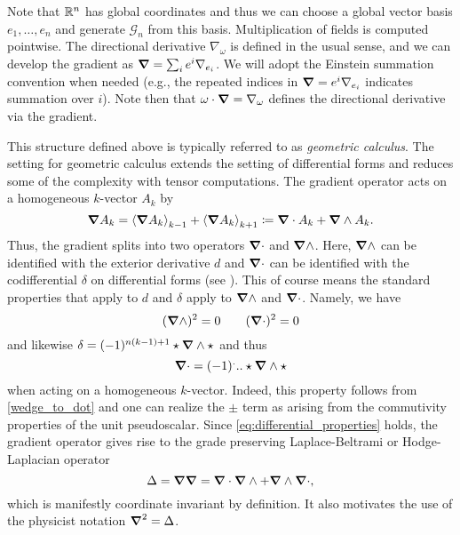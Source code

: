 \documentclass[12pt]{article}
\begin{document}
Note that $\R^n$ has global coordinates and thus we can choose a global vector basis $e_1,\dots,e_n$ and generate $\mathcal{G}_n$ from this basis.  Multiplication of fields is computed pointwise. The directional derivative $\nabla_\omega$ is defined in the usual sense, and we can develop the gradient as $\grad = \sum_{i} e^i \nabla_{e_i}$.  We will adopt the Einstein summation convention when needed (e.g., the repeated indices in $\grad = e^i \nabla_{e_i}$ indicates summation over $i$). Note then that $\omega \cdot \grad = \nabla_\omega$ defines the directional derivative via the gradient.  

This structure defined above is typically referred to as \emph{geometric calculus}.  The setting for geometric calculus extends the setting of differential forms and reduces some of the complexity with tensor computations.  The gradient operator acts on a homogeneous $k$-vector $A_k$ by
\[
\grad A_k = \proj{k-1}{\grad A_k} + \proj{k+1}{\grad A_k} \coloneqq \grad \cdot A_k + \grad \wedge A_k.
\]
Thus, the gradient splits into two operators $\grad \cdot$ and $\grad \wedge$.  Here, $\grad \wedge$ can be identified with the exterior derivative $d$ and $\grad \cdot$ can be identified with the codifferential $\delta$ on differential forms (see \cite{schindler_geometric_2020}). This of course means the standard properties that apply to $d$ and $\delta$ apply to $\grad \wedge$ and $\grad \cdot$. Namely, we have
\begin{equation}
\label{eq:differential_properties}
(\grad \wedge)^2=0 \qquad (\grad \cdot)^2 = 0 
\end{equation}
and likewise $\delta = (-1)^{n(k-1)+1}\star \grad \wedge \star$ and thus 
\begin{equation}
\grad \cdot = (-1)^... \star \grad \wedge \star 
\end{equation}
when acting on a homogeneous $k$-vector. Indeed, this property follows from \ref{wedge_to_dot} and one can realize the $\pm$ term as arising from the commutivity properties of the unit pseudoscalar. Since \ref{eq:differential_properties} holds, the gradient operator gives rise to the grade preserving Laplace-Beltrami or Hodge-Laplacian operator
\[
\Delta = \grad \grad = \grad \cdot \grad \wedge + \grad \wedge \grad \cdot,
\]
which is manifestly coordinate invariant by definition.  It also motivates the use of the physicist notation $\grad^2=\Delta$.
\end{document}
